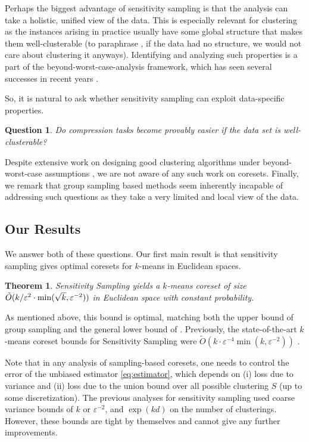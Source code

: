\documentclass[11pt]{article}
\newtheorem{theorem}{Theorem}
\newtheorem{question}{Question}
\theoremstyle{restate}
\theoremstyle{definition}
\newcommand{\eps}{\ensuremath{\varepsilon}}
\begin{document}
Perhaps the biggest advantage of sensitivity sampling is that the analysis can take a holistic, unified view of the data. 
This is especially relevant for clustering as the instances arising in practice usually have some global structure that makes them well-clusterable (to paraphrase \cite{DLS12}, if the data had no structure, we would not care about clustering it anyways). 
Identifying and analyzing such properties is a part of the beyond-worst-case-analysis framework, which has seen several successes in recent years \cite{Roughgarden19}.

So, it is natural to ask whether sensitivity sampling can exploit data-specific properties. 

\begin{question}
    Do compression tasks become provably easier if the data set is well-clusterable? 
\end{question}

Despite extensive work on designing good clustering algorithms under beyond-worst-case assumptions \cite{AngelidakisMM17,BalcanBG13,Cohen-AddadS17,KuK10,ORSS12}, we are not aware of any such work on coresets. 
Finally, we remark that group sampling based methods seem inherently incapable of addressing such questions as they take a very limited and local view of the data.


\subsection{Our Results}
We answer both of these questions. 
Our first main result is that sensitivity sampling gives optimal coresets for $k$-means in Euclidean spaces.
\begin{theorem}\label{thm: worst-case-coreset-thm}
Sensitivity Sampling yields a $k$-means coreset of size $\Tilde{O}(k/\varepsilon^2\cdot \min(\sqrt{k},\varepsilon^{-2}))$ in Euclidean space with constant probability.
\end{theorem}
As mentioned above, this bound is optimal, matching both the upper bound of group sampling \cite{CSS21,Cohen-AddadLSSS22} and the general lower bound of \cite{HLW23}.
Previously, the state-of-the-art $k$-means coreset bounds for Sensitivity Sampling were $\tilde{O}(k\cdot \varepsilon^{-4}\min(k,\varepsilon^{-2}))$ \cite{huang2020coresets}. 


Note that in any analysis of sampling-based coresets, one needs to control the error of the unbiased estimator \eqref{eq:estimator}, which depends on (i) loss due to variance and (ii) loss due to the union bound over all possible clustering $S$ (up to some discretization).
The previous analyses for sensitivity sampling used coarse variance bounds of $k$ or $\eps^{-2}$, and $\exp(kd)$ on the number of clusterings.
However, these bounds are tight by themselves and cannot give any further improvements.
\end{document}

